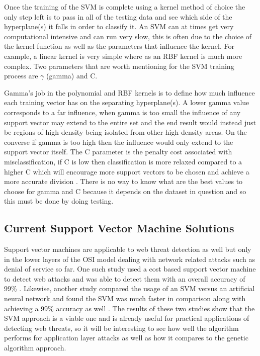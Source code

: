 Once the training of the SVM is complete using a kernel method of choice the only step left is to pass in all of the testing data and see which side of the hyperplane(s) it falls in order to classify it.  An SVM can at times get very computational intensive and can run very slow, this is often due to the choice of the kernel function as well as the parameters that influence the kernel.  For example, a linear kernel is very simple where as an RBF kernel is much more complex.  Two parameters that are worth mentioning for the SVM training process are $\gamma$ (gamma) and C.

Gamma’s job in the polynomial and RBF kernels is to define how much influence each training vector has on the separating hyperplane(s).  A lower gamma value corresponds to a far influence, when gamma is too small the influence of any support vector may extend to the entire set and the end result would instead just be regions of high density being isolated from other high density areas.  On the converse if gamma is too high then the influence would only extend to the support vector itself.  The C parameter is the penalty cost associated with misclassification, if C is low then classification is more relaxed compared to a higher C which will encourage more support vectors to be chosen and achieve a more accurate division \cite{rbfSVMParameters}.  There is no way to know what are the best values to choose for gamma and C because it depends on the dataset in question and so this must be done by doing testing.

\subsection{Current Support Vector Machine Solutions} \label{sec:SVMSolutions}

Support vector machines are applicable to web threat detection as well but only in the lower layers of the OSI model dealing with network related attacks such as denial of service so far.  One such study used a cost based support vector machine to detect web attacks and was able to detect them with an overall accuracy of 99\% \cite{intrusionDetectionCostBased}.  Likewise, another study compared the usage of an SVM versus an artificial neural network and found the SVM was much faster in comparison along with achieving a 99\% accuracy as well \cite{intrusionDetectionNeural}.  The results of these two studies show that the SVM approach is a viable one and is already useful for practical applications of detecting web threats, so it will be interesting to see how well the algorithm performs for application layer attacks as well as how it compares to the genetic algorithm approach.
